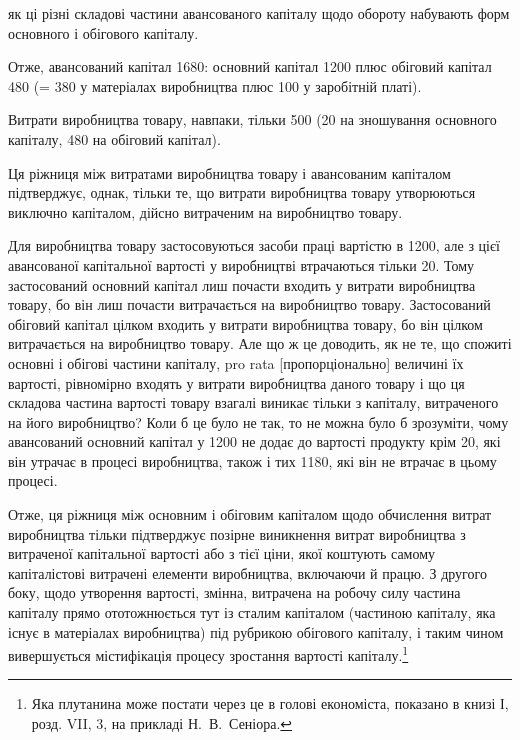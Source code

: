 \parcont{}  %
як ці різні складові частини авансованого капіталу щодо обороту
набувають форм основного і обігового капіталу.

Отже, авансований капітал \deq{} 1680: основний
капітал \deq{} 1200 плюс обіговий капітал \deq{}
480 (= 380 у матеріалах
виробництва плюс 100 у заробітній платі).

Витрати виробництва товару, навпаки, \deq{} тільки 500 (20 на зношування основного капіталу,
480 на обіговий капітал).

Ця ріжниця між витратами виробництва товару і авансованим
капіталом підтверджує, однак, тільки те, що витрати
виробництва товару утворюються виключно капіталом, дійсно
витраченим на виробництво товару.

Для виробництва товару застосовуються засоби праці вартістю
в 1200, але з цієї авансованої капітальної
вартості у виробництві втрачаються тільки 20. Тому застосований основний капітал лиш почасти
входить у витрати виробництва товару, бо він лиш почасти
витрачається на виробництво товару. Застосований обіговий
капітал цілком входить у витрати виробництва товару, бо він
цілком витрачається на виробництво товару. Але що ж це доводить,
як не те, що спожиті основні і обігові частини капіталу,
pro rata [пропорціонально] величині їх вартості, рівномірно
входять у витрати виробництва даного товару і що ця складова
частина вартості товару взагалі виникає тільки з капіталу,
витраченого на його виробництво? Коли б це було не так, то
не можна було б зрозуміти, чому авансований основний капітал
у 1200 не додає до вартості продукту крім
20, які він утрачає в процесі виробництва,
також і тих 1180, які він не втрачає в цьому
процесі.

Отже, ця ріжниця між основним і обіговим капіталом щодо
обчислення витрат виробництва тільки підтверджує позірне
виникнення витрат виробництва з витраченої капітальної вартості
або з тієї ціни, якої коштують самому капіталістові витрачені
елементи виробництва, включаючи й працю. З другого
боку, щодо утворення вартості, змінна, витрачена на робочу
силу частина капіталу прямо ототожнюється тут із сталим капіталом
(частиною капіталу, яка існує в матеріалах виробництва)
під рубрикою обігового капіталу, і таким чином вивершується
містифікація процесу зростання вартості капіталу.\footnote{
Яка плутанина може постати через це в голові економіста, показано
в книзі І, розд. VII, 3, на прикладі Н.~В.~Сеніора.
}

